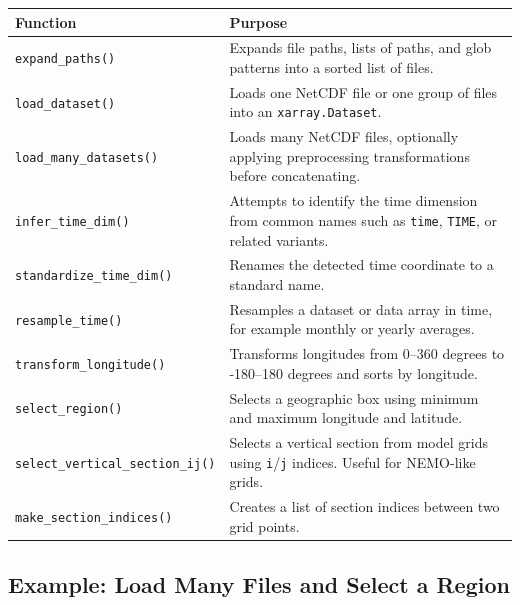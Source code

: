 \documentclass[11pt,a4paper]{article}
\begin{document}
\begin{longtable}{p{}p{}}
\toprule
\textbf{Function} & \textbf{Purpose} \\
\midrule
\endhead

\texttt{expand\_paths()} &
Expands file paths, lists of paths, and glob patterns into a sorted list of files. \\

\texttt{load\_dataset()} &
Loads one NetCDF file or one group of files into an \texttt{xarray.Dataset}. \\

\texttt{load\_many\_datasets()} &
Loads many NetCDF files, optionally applying preprocessing transformations before concatenating. \\

\texttt{infer\_time\_dim()} &
Attempts to identify the time dimension from common names such as \texttt{time}, \texttt{TIME}, or related variants. \\

\texttt{standardize\_time\_dim()} &
Renames the detected time coordinate to a standard name. \\

\texttt{resample\_time()} &
Resamples a dataset or data array in time, for example monthly or yearly averages. \\

\texttt{transform\_longitude()} &
Transforms longitudes from 0--360 degrees to -180--180 degrees and sorts by longitude. \\

\texttt{select\_region()} &
Selects a geographic box using minimum and maximum longitude and latitude. \\

\texttt{select\_vertical\_section\_ij()} &
Selects a vertical section from model grids using \texttt{i}/\texttt{j} indices. Useful for NEMO-like grids. \\

\texttt{make\_section\_indices()} &
Creates a list of section indices between two grid points. \\

\bottomrule
\end{longtable}

\subsection{Example: Load Many Files and Select a Region}
\end{document}
